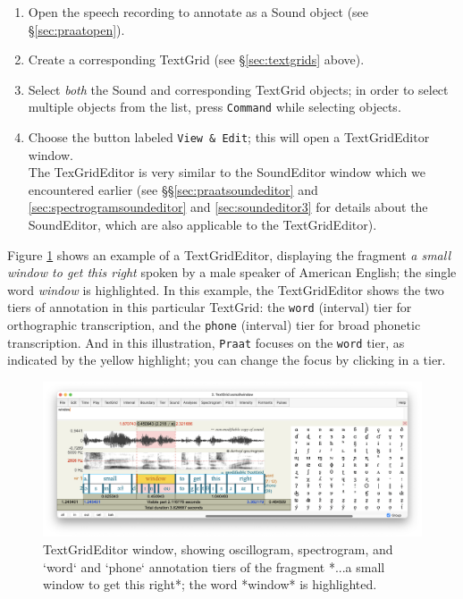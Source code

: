 \documentclass[
]{book}
\begin{document}
\begin{enumerate}
\def\labelenumi{(\arabic{enumi})}
\item
  Open the speech recording to annotate as a Sound object (see §\ref{sec:praatopen}).
\item
  Create a corresponding TextGrid (see §\ref{sec:textgrids} above).
\item
  Select \emph{both} the Sound and corresponding TextGrid objects; in order to select multiple objects from the list, press \texttt{Command} while selecting objects.
\item
  Choose the button labeled \texttt{View\ \&\ Edit}; this will open a TextGridEditor window.\\
  The TexGridEditor is very similar to the SoundEditor window which we encountered earlier (see §§\ref{sec:praatsoundeditor} and
  \ref{sec:spectrogramsoundeditor} and
  \ref{sec:soundeditor3} for details about the SoundEditor, which are also applicable to the TextGridEditor).
\end{enumerate}

Figure \ref{fig:window-textgrideditor} shows an example of a TextGridEditor, displaying the fragment \emph{a small window to get this right} spoken by a male speaker of American English; the single word \emph{window} is highlighted.
In this example, the TextGridEditor shows the two tiers of annotation in this particular TextGrid: the \texttt{word} (interval) tier for orthographic transcription, and the \texttt{phone} (interval) tier for broad phonetic transcription. And in this illustration, \texttt{Praat} focuses on the \texttt{word} tier, as indicated by the yellow highlight; you can change the focus by clicking in a tier.

\begin{figure}

{\centering \includegraphics{figures/asmallwindowtogetthisright_TextGridEditor20250130} 

}

\caption{TextGridEditor window, showing oscillogram, spectrogram, and `word` and `phone` annotation tiers of the fragment *...a small window to get this right*; the word *window* is highlighted.}\label{fig:window-textgrideditor}
\end{figure}
\end{document}
